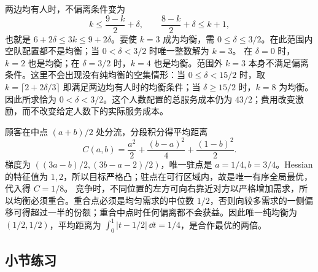 两边均有人时，不偏离条件变为
\[
 k\le\frac{9-k}{2}+\delta,\qquad
 \frac{8-k}{2}+\delta\le k+1,
\]
也就是 $6+2\delta\le3k\le9+2\delta$。要使 $k=3$ 成为均衡，需 $0\le\delta\le3/2$。在此范围内空队配置都不是均衡；当 $0<\delta<3/2$ 时唯一整数解为 $k=3$。
在 $\delta=0$ 时，$k=2$ 也是均衡；在 $\delta=3/2$ 时，$k=4$ 也是均衡。范围外 $k=3$ 本身不满足偏离条件。这里不会出现没有纯均衡的空集情形：当 $0\le\delta<15/2$ 时，取 $k=\lceil2+2\delta/3\rceil$ 即满足两边均有人时的均衡条件；当 $\delta\ge15/2$ 时，$k=8$ 为均衡。因此所求恰为 $0<\delta<3/2$。这个人数配置的总服务成本仍为 $43/2$；费用改变激励，而不改变给定人数下的实际服务成本。

顾客在中点 $(a+b)/2$ 处分流，分段积分得平均距离
\[
 C(a,b)=\frac{a^2}{2}+\frac{(b-a)^2}{4}
       +\frac{(1-b)^2}{2}.
\]
梯度为 $((3a-b)/2,(3b-a-2)/2)$，唯一驻点是 $a=1/4,b=3/4$。Hessian 的特征值为 $1,2$，所以目标严格凸；驻点在可行区域内，故是唯一有序全局最优，代入得 $C=1/8$。
竞争时，不同位置的左方可向右靠近对方以严格增加需求，所以均衡必须重合。重合点必须是均匀需求的中位数 $1/2$，否则向较多需求的一侧偏移可得超过一半的份额；重合中点时任何偏离都不会获益。因此唯一纯均衡为 $(1/2,1/2)$，平均距离为 $\int_0^1|t-1/2|\,\dd t=1/4$，是合作最优的两倍。

\par{}
\subsection*{小节练习}





